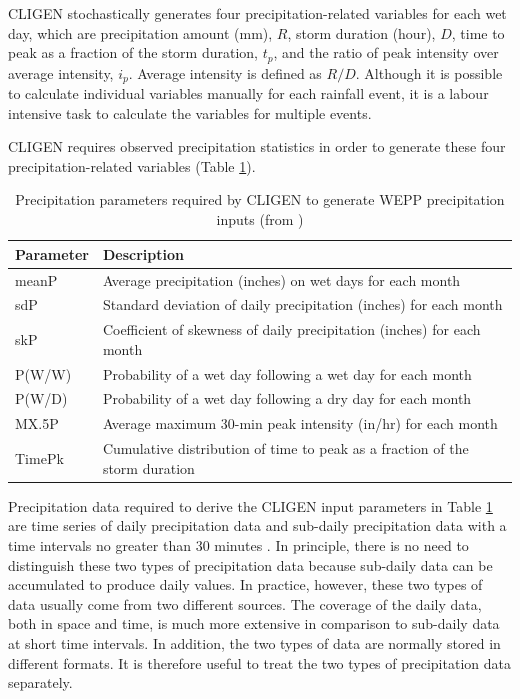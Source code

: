 CLIGEN stochastically generates four precipitation-related variables for each
wet day, which are precipitation amount  (mm), $R$, storm duration (hour), $D$,
time to peak as a fraction of the storm duration, $t_p$, and the ratio of peak
intensity over average intensity, $i_p$. Average intensity is defined as $R/D$.
Although it is possible to calculate individual variables manually for each
rainfall event, it is a labour intensive task to calculate the variables for
multiple events.

CLIGEN requires observed precipitation statistics in order to generate these
four precipitation-related variables (Table
\ref{tab:PrecipitaionParametersRequiredByCLIGEN}).

\begin{table}[htbp]
  \centering
  \caption[Precipitation parameters required by CLIGEN]{Precipitation
parameters required by CLIGEN to generate WEPP precipitation inputs (from
\citealp{nicks1995-2})}
  \label{tab:PrecipitaionParametersRequiredByCLIGEN}
  \footnotesize
    \begin{tabular}{ll}
    \toprule
    \textbf{Parameter} & \textbf{Description} \\
    \midrule
    meanP & Average precipitation (inches) on wet days for each month\\
    sdP & Standard deviation of daily precipitation (inches) for each month\\
    skP & Coefficient of skewness of daily precipitation (inches) for each
month\\
    P(W/W) & Probability of a wet day following a wet day for each month\\
    P(W/D) & Probability of a wet day following a dry day for each month\\
    {MX.5P} & Average maximum 30-min peak intensity (in/hr) for each month\\
    TimePk & Cumulative distribution of time to peak as a fraction of the storm
duration\\
    \bottomrule
    \end{tabular}
\end{table}

Precipitation data required to derive the CLIGEN input parameters in Table
\ref{tab:PrecipitaionParametersRequiredByCLIGEN} are time series of daily
precipitation data and sub-daily precipitation data with a time intervals no
greater than 30 minutes \citep{nicks1995-2,yu2000-301}. In
principle, there is no need to distinguish these two types of precipitation data
because sub-daily data can be accumulated to produce daily values. In practice,
however, these two types of data usually come from two different sources. The
coverage of the daily data, both in space and time, is much more extensive in
comparison to sub-daily data at short time intervals. In addition, the two types
of data are normally stored in different formats. It is therefore useful to
treat the two types of precipitation data separately.

